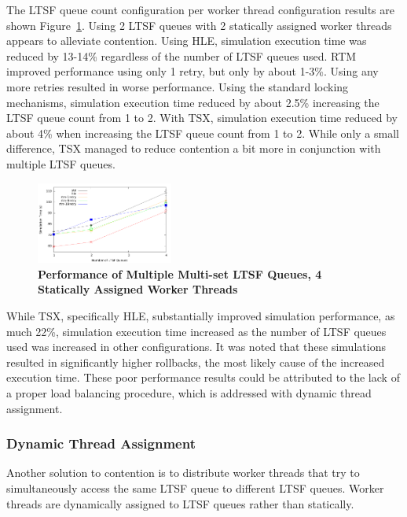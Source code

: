 \documentclass{sig-alternate}
\begin{document}
The LTSF queue count configuration per worker thread configuration results are shown
Figure~\ref{fig:noThrMig_timeVSschq_4threads}.  Using 2 LTSF queues with 2 statically
assigned worker threads appears to alleviate contention.  Using HLE, simulation execution
time was reduced by 13-14\% regardless of the number of LTSF queues used.  RTM improved
performance using only 1 retry, but only by about 1-3\%.  Using any more retries resulted
in worse performance.  Using the standard locking mechanisms, simulation execution time
reduced by about 2.5\% increasing the LTSF queue count from 1 to 2.  With TSX, simulation
execution time reduced by about 4\% when increasing the LTSF queue count from 1 to 2.
While only a small difference, TSX managed to reduce contention a bit more in conjunction
with multiple LTSF queues.

\begin{figure}
    \centering
    \graphicspath{ {./figures/} }
    \includegraphics[width=0.4\textwidth,keepaspectratio]{hugeepidemicsim-NOmig-timeVSschedQs-multiset-4thread}
    \caption{\textbf{Performance of Multiple Multi-set LTSF Queues, 4 Statically Assigned Worker Threads}}
    \label{fig:noThrMig_timeVSschq_4threads}
\end{figure}

While TSX, specifically HLE, substantially improved simulation performance, as much 22\%,
simulation execution time increased as the number of LTSF queues used was increased in
other configurations.  It was noted that these simulations resulted in significantly
higher rollbacks, the most likely cause of the increased execution time.  These poor
performance results could be attributed to the lack of a proper load balancing procedure,
which is addressed with dynamic thread assignment.

\subsubsection{Dynamic Thread Assignment}

Another solution to contention is to distribute worker threads that try to simultaneously
access the same LTSF queue to different LTSF queues.  Worker threads are dynamically
assigned to LTSF queues rather than statically.
\end{document}
